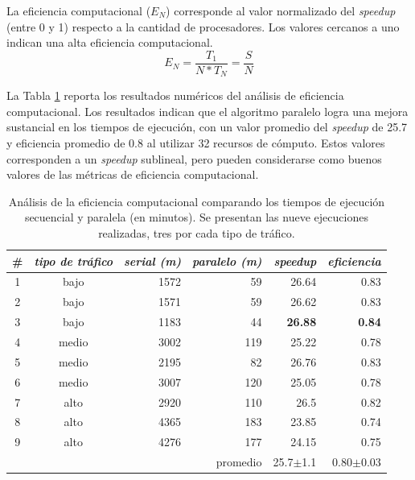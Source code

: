 La eficiencia computacional (${E_N}$) corresponde al valor normalizado del \emph{speedup} (entre 0 y 1) respecto a la cantidad de procesadores. Los valores cercanos a uno indican una alta eficiencia computacional.
\begin{equation}
\label{eq:funcion_eficiencia}
{E_N} = \frac{T_1}{N*T_N} = \frac{S}{N}
\end{equation}

 La Tabla \ref{table:analisis_speedup} reporta los resultados numéricos del análisis de eficiencia computacional. Los resultados indican que el algoritmo paralelo logra una mejora sustancial en los tiempos de ejecución, con un valor promedio del \emph{speedup} de 25.7 y eficiencia promedio de 0.8 al utilizar 32 recursos de cómputo. Estos valores corresponden a un \emph{speedup} sublineal, pero pueden considerarse como buenos valores de las métricas de eficiencia computacional.

\begin{table}[H]
	\renewcommand{\arraystretch}{1.2}
	\caption[Análisis de la eficiencia computacional.]{Análisis de la eficiencia computacional comparando los tiempos de ejecución secuencial y paralela (en minutos). Se presentan las nueve ejecuciones realizadas, tres por cada tipo de tráfico. }
	\label{table:analisis_speedup}
	\centering
	\begin{tabular}{ccrrrr}
		\hline
		
		\#&
		\emph{tipo de \newline tráfico} &
		\emph{serial (m)} & 
		\emph{paralelo (m)} &
		\emph{speedup} &
		\emph{eficiencia}
		\\ 
		\hline
		1& bajo  & 1572 & 59 & 26.64 & 0.83\\
		2& bajo  & 1571 & 59 & 26.62 & 0.83\\
		3& bajo  & 1183 & 44 & \textbf{26.88} & \textbf{0.84}\\
		
		4& medio  & 3002 & 119 & 25.22 & 0.78\\
		5& medio  & 2195 & 82 & 26.76 & 0.83\\
		6& medio  & 3007 & 120 & 25.05 & 0.78\\
		
		7& alto  & 2920 & 110 & 26.5 & 0.82\\
		8& alto  & 4365 & 183 & 23.85 & 0.74\\
		9& alto  & 4276 & 177 & 24.15 & 0.75\\
		\hline
		 &  &  & promedio & 25.7$\pm$1.1 & 0.80$\pm$0.03\\
		
		\hline
	\end{tabular}
\end{table}



